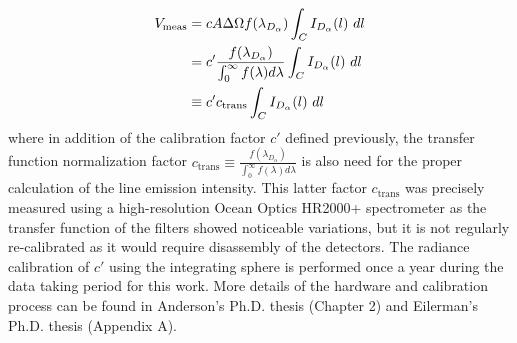 \begin{align}
    V_{\text{meas}} &= c A\Delta\Omega f(\lambda_{D_{\alpha}}) \int_{C}I_{D_{\alpha}}(l)\ dl \nonumber\\
    &= c' \frac{f(\lambda_{D_{\alpha}})}{\int_0^{\infty}f(\lambda)d\lambda}\int_C I_{D_{\alpha}}(l)\ dl \\
    &\equiv c' c_{\text{trans}}\int_C I_{D_{\alpha}}(l)\ dl 
\end{align}
where in addition of the calibration factor $c'$ defined previously, the transfer function normalization factor $c_{\text{trans}} \equiv \frac{f(\lambda_{D_{\alpha}})}{\int_0^{\infty}f(\lambda)d\lambda}$ is also need for the proper calculation of the line emission intensity. This latter factor $c_{\text{trans}}$ was precisely measured using a high-resolution Ocean Optics HR2000+ spectrometer as the transfer function of the filters showed noticeable variations\cite{Eilerman}, but it is not regularly re-calibrated as it would require disassembly of the detectors. The radiance calibration of $c'$ using the integrating sphere is performed once a year during the data taking period for this work. More details of the hardware and calibration process can be found in Anderson's Ph.D. thesis\cite{Anderson2001} (Chapter 2) and Eilerman's Ph.D. thesis\cite{Eilerman} (Appendix A).